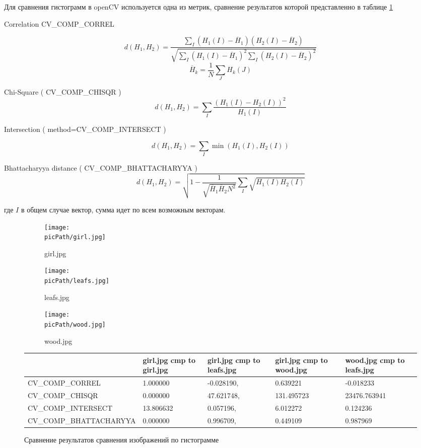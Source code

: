 \documentclass[oneside,final,14pt]{extreport}
\newcommand{\picPath}{pictures}
\begin{document}
Для сравнения гистограмм в openCV используется одна из метрик, сравнение результатов которой представленно в таблице \ref{correlation_table}

Correlation  CV\_COMP\_CORREL
 
$$
d(H_1,H_2) 
= 
\frac{
\sum_I(H_1(I) - \overline{H}_1)
(H_2(I)-\overline{H}_2)
}{
	\sqrt{
		\sum_I(H_1(I) - \overline{H}_1)^2
		\sum_I(H_2(I) - \overline{H}_2)^2
	}
}
$$
$$
\overline{H}_k 
= 
\frac{1}{N}
\sum_J H_k(J)
$$

Chi-Square ( CV\_COMP\_CHISQR )
$$
d(H_1,H_2)
=
\sum_I \frac{
	(H_1(I) - H_2(I))^2}
{H_1(I)}
$$

Intersection ( method=CV\_COMP\_INTERSECT )

$$
d(H_1,H_2)
=
\sum_I 
\min (H_1(I),H_2(I))
$$

Bhattacharyya distance ( CV\_COMP\_BHATTACHARYYA )
$$
d(H_1,H_2)
=
\sqrt{ 1 - 
\frac{1}{
  \sqrt{\overline{H}_1 
  		\overline{H}_2
  		N^2}
  }
  \sum_I
  \sqrt{H_1(I) H_2(I)}
}
$$

где $I$ в общем случае вектор, сумма идет по всем возможным векторам.
\begin{figure}[h!]
\begin{subfigure}[b]{0.2\linewidth}
    	\texttt{[image: \\picPath/girl.jpg]}
    	\caption{ girl.jpg}
  \end{subfigure}
  \begin{subfigure}[b]{0.3\linewidth}
    	\texttt{[image: \\picPath/leafs.jpg]}
    	\caption{ leafs.jpg}
  \end{subfigure}
  \begin{subfigure}[b]{0.3\linewidth}
    	\texttt{[image: \\picPath/wood.jpg]}
    	\caption{ wood.jpg}
  \end{subfigure}
\begin{tabularx}{\textwidth}{|X|X|X|X|X|}
\hline
 & 
girl.jpg cmp to girl.jpg
&
girl.jpg cmp to leafs.jpg
&
girl.jpg cmp to wood.jpg
&
wood.jpg cmp to leafs.jpg
\\
\hline
CV\_\allowbreak COMP\_\allowbreak CORREL
&
 1.000000
& 
 -0.028190, 
&
0.639221
&
-0.018233
\\
\hline
CV\_\allowbreak COMP\_\allowbreak CHISQR
&
0.000000
&
 47.621748, 
&
131.495723
&
23476.763941
\\
\hline
CV\_\allowbreak COMP\_\allowbreak INTERSECT
&
13.806632
&
0.057196, 
&
6.012272
&
 0.124236
\\
\hline
CV\_\allowbreak COMP\_\allowbreak BHATTA\allowbreak CHARYYA
&
 0.000000
&
0.996709, 
&
0.449109
&
0.987969
\\
\hline
\end{tabularx}
	
  
\caption{Сравнение результатов сравнения изображений по гистограмме}
\label{correlation_table}
\end{figure}
\end{document}
